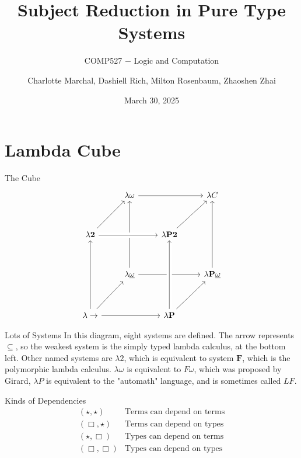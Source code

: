\documentclass{beamer}
\title{\normalsize{Subject Reduction in Pure Type Systems}\vspace{0.05in}}
\author{\small Charlotte Marchal, Dashiell Rich, Milton Rosenbaum, Zhaoshen Zhai}
\subtitle{\scriptsize{COMP527 $-$ Logic and Computation}}
\date{\footnotesize March 30, 2025}
\begin{document}
\frame{\titlepage}
    \section{Lambda Cube}

    \begin{frame}{The Cube}
        \[\begin{tikzcd}[ampersand replacement=\&, row sep=3.4em]
            \& \lambda\omega \arrow[rr] \arrow[from=dd] \&\& \lambda C \\
            \lambda \textbf{2} \arrow[ur] \arrow[rr, crossing over] \&\& \lambda \textbf{P2} \arrow[ur] \& \\
            \& \lambda\underline{\omega} \arrow[rr] \&\& \lambda \textbf{P} \underline{\omega} \arrow[uu] \\
            \lambda\rightarrow \arrow[uu] \arrow[rr] \arrow[ur] \&\& \lambda \textbf{P} \arrow[ur] \arrow[uu, crossing over]
        \end{tikzcd}\]
    \end{frame}

    \begin{frame}{Lots of Systems}
        In this diagram, eight systems are defined. The arrow represents $\subseteq$, so the weakest system is the simply typed lambda calculus, at the bottom left. Other named systems are $\lambda 2$, which is equivalent to system $\textbf{F}$, which is the polymorphic lambda calculus. $\lambda\omega$ is equivalent to $F\omega$, which was proposed by Girard, $\lambda P$ is equivalent to the "automath" language, and is sometimes called $LF$.
    \end{frame}

    \begin{frame}{Kinds of Dependencies}
        \[\begin{array}{c|l}
            (\star, \star) & \text{Terms can depend on terms} \\
            (\Box, \star) & \text{Terms can depend on types} \\
            (\star, \Box) & \text{Types can depend on terms} \\
            (\Box, \Box) & \text{Types can depend on types} \\
        \end{array}\]
    \end{frame}
\end{document}
